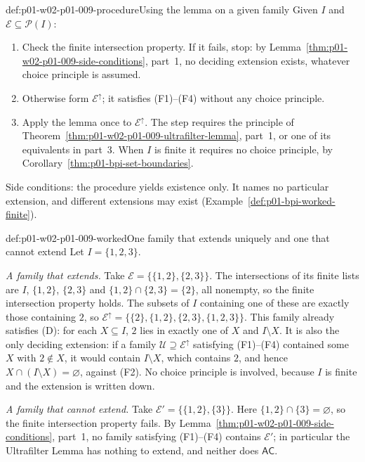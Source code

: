 \begin{hbmethod}{def:p01-w02-p01-009-procedure}{Using the lemma on a given family}
Given \(I\) and \(\mathcal E\subseteq\mathcal P(I)\):
\begin{enumerate}
  \item Check the finite intersection property. If it fails, stop: by
    Lemma~\ref{thm:p01-w02-p01-009-side-conditions}, part~1, no deciding
    extension exists, whatever choice principle is assumed.
  \item Otherwise form \(\mathcal E^{\uparrow}\); it satisfies (F1)--(F4)
    without any choice principle.
  \item Apply the lemma once to \(\mathcal E^{\uparrow}\). The step requires
    the principle of Theorem~\ref{thm:p01-w02-p01-009-ultrafilter-lemma},
    part~1, or one of its equivalents in part~3. When \(I\) is finite it
    requires no choice principle, by Corollary~\ref{thm:p01-bpi-set-boundaries}.
\end{enumerate}
Side conditions: the procedure yields existence only. It names no particular
extension, and different extensions may exist
(Example~\ref{def:p01-bpi-worked-finite}).
\end{hbmethod}

\begin{hbexample}{def:p01-w02-p01-009-worked}{One family that extends uniquely and one that cannot extend}
Let \(I=\{1,2,3\}\).

\emph{A family that extends.} Take \(\mathcal E=\{\{1,2\},\{2,3\}\}\). The
intersections of its finite lists are \(I\), \(\{1,2\}\), \(\{2,3\}\) and
\(\{1,2\}\cap\{2,3\}=\{2\}\), all nonempty, so the finite intersection
property holds. The subsets of \(I\) containing one of these are exactly those
containing \(2\), so
\(\mathcal E^{\uparrow}=\{\{2\},\{1,2\},\{2,3\},\{1,2,3\}\}\). This family
already satisfies (D): for each \(X\subseteq I\), \(2\) lies in exactly one of
\(X\) and \(I\setminus X\). It is also the only deciding extension: if a
family \(\mathcal U\supseteq\mathcal E^{\uparrow}\) satisfying (F1)--(F4)
contained some \(X\) with \(2\notin X\), it would contain \(I\setminus X\),
which contains \(2\), and hence \(X\cap(I\setminus X)=\varnothing\), against
(F2). No choice principle is involved, because \(I\) is finite and the
extension is written down.

\emph{A family that cannot extend.} Take \(\mathcal E'=\{\{1,2\},\{3\}\}\).
Here \(\{1,2\}\cap\{3\}=\varnothing\), so the finite intersection property
fails. By Lemma~\ref{thm:p01-w02-p01-009-side-conditions}, part~1, no family
satisfying (F1)--(F4) contains \(\mathcal E'\); in particular the Ultrafilter
Lemma has nothing to extend, and neither does \(\mathsf{AC}\).
\end{hbexample}

